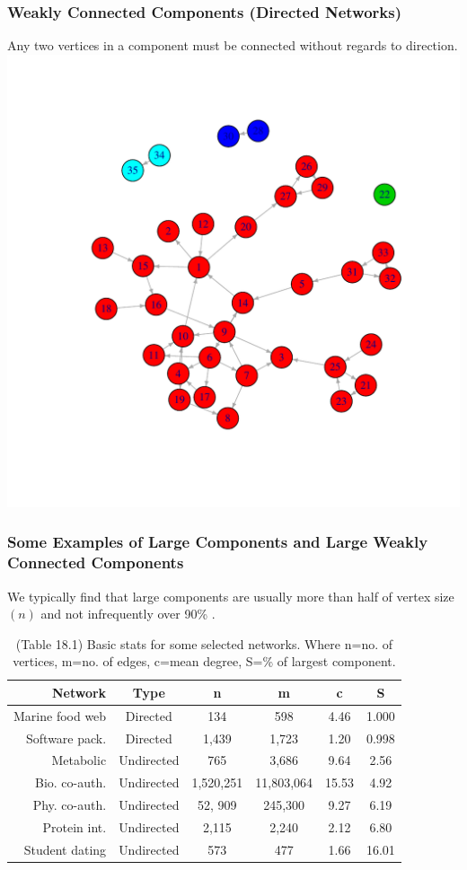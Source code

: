 \documentclass[smaller]{beamer}
\begin{document}
\begin{frame}
   \frametitle{Weakly Connected Components (Directed Networks)}
   Any two vertices in a component must be connected without regards to direction.
   \includegraphics[scale=0.5]{figures/weak_dg.pdf} 
\end{frame}

\begin{frame}
\frametitle{Some Examples of Large Components and Large Weakly 
                 Connected Components}
We typically find that large components are usually more than half of vertex size $(n)$ and not infrequently over 90\% .                
\begin{table}[ht]
\caption{(Table 18.1) Basic stats for some selected networks.
               Where n=no. of vertices, m=no. of edges, c=mean degree, S=\% of largest component.} 
\centering 
\begin{tabular}{r c c c c c}
\hline
Network & Type & n & m & c & S \\  \hline
Marine food web & Directed & 134 & 598 & 4.46 & 1.000 \\
Software pack. & Directed & 1,439 & 1,723 & 1.20 & 0.998 \\
Metabolic & Undirected & 765 & 3,686 & 9.64 & 2.56  \\
Bio. co-auth. & Undirected & 1,520,251 & 11,803,064 & 15.53 & 4.92 \\
Phy. co-auth. & Undirected & 52, 909 & 245,300  & 9.27 & 6.19 \\
Protein int.& Undirected & 2,115 & 2,240 & 2.12 & 6.80 \\
Student dating & Undirected & 573 & 477 & 1.66 & 16.01 \\
\end{tabular}
\end{table}
\end{frame}
\end{document}
